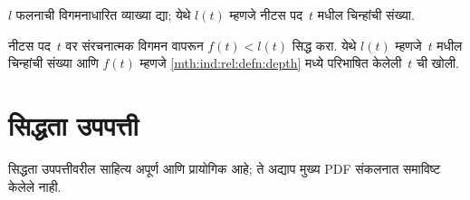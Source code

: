\begin{prob}
$l$ फलनाची विगमनाधारित व्याख्या द्या; येथे $l(t)$ म्हणजे नीटस पद~$t$ मधील चिन्हांची संख्या.
\end{prob}

\begin{prob}
नीटस पद~$t$ वर संरचनात्मक विगमन वापरून $f(t) < l(t)$ सिद्ध करा. येथे $l(t)$ म्हणजे~$t$ मधील चिन्हांची संख्या आणि $f(t)$ म्हणजे \ref{mth:ind:rel:defn:depth} मध्ये परिभाषित केलेली~$t$ ची खोली.
\end{prob}



\part{सिद्धता उपपत्ती}\label{pt:part}
\begin{editorial}
  सिद्धता उपपत्तीवरील साहित्य अपूर्ण आणि प्रायोगिक आहे;
  ते अद्याप मुख्य PDF संकलनात समाविष्ट केलेले नाही.
\end{editorial}
